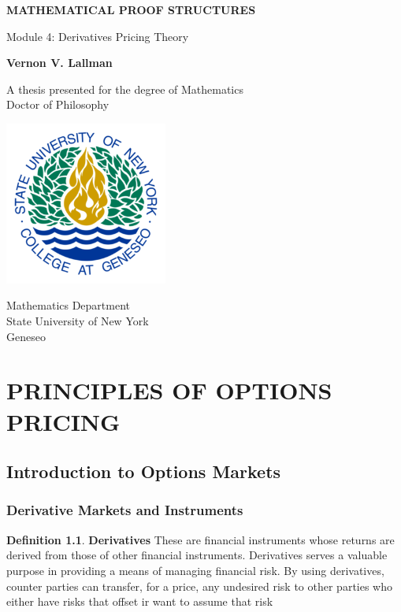 \documentclass{book}
\theoremstyle{definition}
\newtheorem{definition}{Definition}[section]
\theoremstyle{remark}
\begin{document}
\begin{titlepage}
    \begin{center}
        \vspace*{1cm}
        
        \textbf{MATHEMATICAL PROOF STRUCTURES}
        
        \vspace{0.5cm}
        Module 4: Derivatives Pricing Theory
        
        \vspace{1.5cm}
        
        \textbf{Vernon V. Lallman}
        
        \vfill
        
        A thesis presented for the degree of Mathematics\\
        Doctor of Philosophy
        
        \vspace{0.8cm}
        
        \includegraphics[width=0.4\textwidth]{university}
        
        Mathematics Department\\
        State University of New York \\
        Geneseo\\
        \date{\today}
        
    \end{center}
\end{titlepage}

\tableofcontents

\newpage
\chapter{PRINCIPLES OF OPTIONS PRICING}
\section{Introduction to Options Markets}
    \subsection{Derivative Markets and Instruments}
        \begin{definition}{\textbf{Derivatives}}
        These are financial instruments whose returns are derived from those of other financial instruments. Derivatives serves a valuable purpose in providing a means of managing financial risk. By using derivatives, counter parties can transfer, for a price, any undesired risk to other parties who either have risks that offset ir want to assume that risk
        \end{definition}
        
\end{document}
